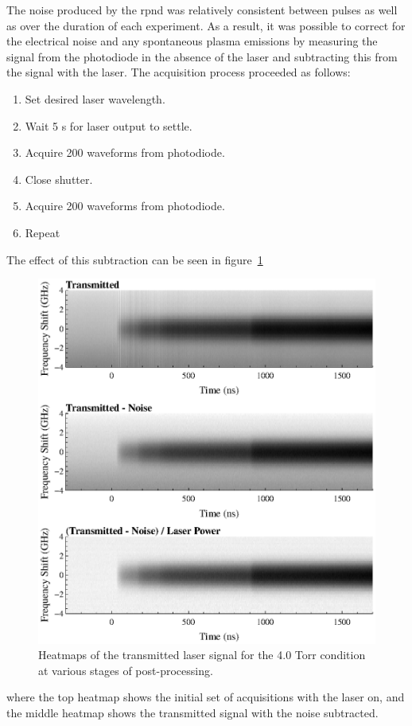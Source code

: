 The noise produced by the \acs{rpnd} was relatively consistent between pulses as
well as over the duration of each experiment. As a result, it was possible to
correct for the electrical noise and any spontaneous plasma emissions by
measuring the signal from the photodiode in the absence of the laser and
subtracting this from the signal with the laser. The acquisition process
proceeded as follows:
\begin{enumerate}
  \item Set desired laser wavelength.
  \item Wait 5 s for laser output to settle.
  \item Acquire 200 waveforms from photodiode.
  \item Close shutter.
  \item Acquire 200 waveforms from photodiode.
  \item Repeat
\end{enumerate}
The effect of this subtraction can be seen in figure~\ref{fig:contours}
\begin{figure}
  \centering
  \includegraphics{./chapters/metastables/figures/contours.eps}
  \caption{Heatmaps of the transmitted laser signal for the 4.0 Torr condition at 
  various stages of post-processing.}
  \label{fig:contours}
\end{figure}
where the top heatmap shows the initial set of acquisitions with the laser on,
and the middle heatmap shows the transmitted signal with the noise subtracted.

